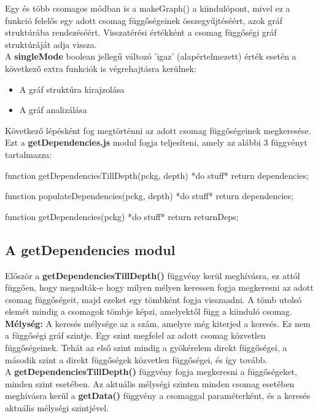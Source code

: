 Egy és több csomagos módban is a makeGraph() a kiindulópont, mivel ez a funkció felelős egy adott csomag függőségeinek összegyűjtéséért, azok gráf struktúrába rendezéséért.
Visszatérési értékként a csomag függőségi gráf struktúráját adja vissza.\\

A \textbf{singleMode} boolean jellegű változó 'igaz' (alapértelmezett) érték esetén a következő extra funkciók is végrehajtásra kerülnek:
	\begin{itemize}
		\item A gráf struktúra kirajzolása
		\item A gráf analizálása
	\end{itemize}

Következő lépésként fog megtörténni az adott csomag függőségeinek megkeresése. Ezt a \textbf{getDependencies.js} modul fogja teljesíteni, amely az alábbi 3 függvényt tartalmazza:

\begin{js}
function getDependenciesTillDepth(pckg, depth){
	*do stuff*
	return dependencies;
}

function populateDependencies(pckg, depth){
	*do stuff*
	return dependencies;
}

function getDependencies(pckg){
	*do stuff*
	return returnDeps;
}
\end{js}

\subsection{A getDependencies modul}

Először a \textbf{getDependenciesTillDepth()} függvény kerül meghívásra, ez attól függően, hogy megadták-e hogy milyen mélyen keressen fogja megkeresni az adott csomag függőségeit, majd ezeket egy tömbként fogja visszaadni. A tömb utolsó elemét mindig a csomagok tömbje képzi, amelyektől függ a kiinduló csomag.\\

\textbf{Mélység: }A keresés mélysége az a szám, amelyre még kiterjed a keresés. Ez nem a függőségi gráf szintje. Egy szint megfelel az adott csomag közvetlen függőségeinek. Tehát az első szint mindig a gyökérelem direkt függőségei, a második szint a direkt függőségek közvetlen függőségei, és így tovább.\\

A \textbf{getDependenciesTillDepth()} függvény fogja megkeresni a függőségeket, minden szint esetében. Az aktuális mélységi szinten minden csomag esetében meghívásra kerül a \textbf{getData()} függvény a csomaggal paraméterként, és a keresés aktuális mélységi szintjével.

